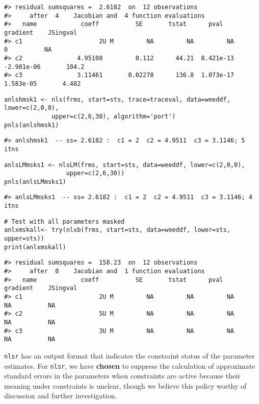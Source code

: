 \begin{verbatim}
#> residual sumsquares =  2.6182  on  12 observations
#>     after  4    Jacobian and  4 function evaluations
#>   name            coeff          SE       tstat      pval      gradient    JSingval   
#> c1                     2U M         NA         NA         NA           0          NA  
#> c2               4.95108         0.112      44.21  8.421e-13  -2.981e-06       104.2  
#> c3               3.11461       0.02278      136.8  1.073e-17   1.583e-05       4.482
\end{verbatim}

\begin{verbatim}
anlshmsk1 <- nls(frms, start=sts, trace=traceval, data=weeddf, lower=c(2,0,0),
             upper=c(2,6,30), algorithm='port')
pnls(anlshmsk1)
\end{verbatim}

\begin{verbatim}
#> anlshmsk1  -- ss= 2.6182 :  c1 = 2  c2 = 4.9511  c3 = 3.1146; 5  itns
\end{verbatim}

\begin{verbatim}
anlsLMmsks1 <- nlsLM(frms, start=sts, data=weeddf, lower=c(2,0,0),
                 upper=c(2,6,30))
pnls(anlsLMmsks1)
\end{verbatim}

\begin{verbatim}
#> anlsLMmsks1  -- ss= 2.6182 :  c1 = 2  c2 = 4.9511  c3 = 3.1146; 4  itns
\end{verbatim}

\begin{verbatim}
# Test with all parameters masked
anlxmskall<- try(nlxb(frms, start=sts, data=weeddf, lower=sts, upper=sts))
print(anlxmskall)
\end{verbatim}

\begin{verbatim}
#> residual sumsquares =  158.23  on  12 observations
#>     after  0    Jacobian and  1 function evaluations
#>   name            coeff          SE       tstat      pval      gradient    JSingval   
#> c1                     2U M         NA         NA         NA          NA          NA  
#> c2                     5U M         NA         NA         NA          NA          NA  
#> c3                     3U M         NA         NA         NA          NA          NA
\end{verbatim}

\texttt{nlsr} has an output format that indicates the constraint status of the parameter
estimates. For \texttt{nlsr}, we have \textbf{chosen} to suppress the calculation of
approximate standard errors in the parameters when constraints are active because
their meaning under constraints is unclear, though we believe this
policy worthy of discussion and further investigation.

